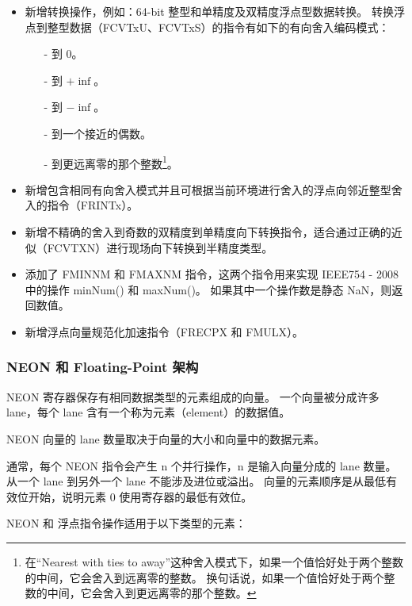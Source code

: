 \begin{itemize}
  \item 新增转换操作，例如：64-bit 整型和单精度及双精度浮点型数据转换。
    转换浮点到整型数据（FCVTxU、FCVTxS）的指令有如下的有向舍入编码模式：

    \begin{itemize}
      \item[-] 到 0。
      \item[-] 到 $+\inf$。
      \item[-] 到 $-\inf$。
      \item[-] 到一个接近的偶数。
      \item[-] 到更远离零的那个整数\footnote{在“Nearest with ties to away”这种舍入模式下，如果一个值恰好处于两个整数的中间，它会舍入到远离零的整数。
          换句话说，如果一个值恰好处于两个整数的中间，它会舍入到更远离零的那个整数。
        }。
    \end{itemize}
  \item 新增包含相同有向舍入模式并且可根据当前环境进行舍入的浮点向邻近整型舍入的指令（FRINTx）。
  \item 新增不精确的舍入到奇数的双精度到单精度向下转换指令，适合通过正确的近似（FCVTXN）进行现场向下转换到半精度类型。
  \item 添加了 FMINNM 和 FMAXNM 指令，这两个指令用来实现 IEEE754 - 2008 中的操作 minNum() 和 maxNum()。
  如果其中一个操作数是静态 NaN，则返回数值。
  \item 新增浮点向量规范化加速指令（FRECPX 和 FMULX）。
\end{itemize}

\subsubsection{NEON 和 Floating-Point 架构}

NEON 寄存器保存有相同数据类型的元素组成的向量。
一个向量被分成许多 lane，每个 lane 含有一个称为元素（element）的数据值。

NEON 向量的 lane 数量取决于向量的大小和向量中的数据元素。

通常，每个 NEON 指令会产生 n 个并行操作，n 是输入向量分成的 lane 数量。
从一个 lane 到另外一个 lane 不能涉及进位或溢出。
向量的元素顺序是从最低有效位开始，说明元素 0 使用寄存器的最低有效位。

NEON 和 浮点指令操作适用于以下类型的元素：

